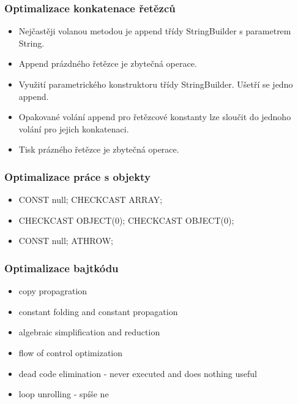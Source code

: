 \subsubsection{Optimalizace konkatenace řetězců}

\begin{itemize}
\item Nejčastěji volanou metodou je append třídy StringBuilder s parametrem String.
\item Append prázdného řetězce je zbytečná operace.
\item Využití parametrického konstruktoru třídy StringBuilder. Ušetří se jedno append.
\item Opakované volání append pro řetězcové konstanty lze sloučit do jednoho volání pro jejich konkatenaci.
\item Tisk prázného řetězce je zbytečná operace.
\end{itemize}

\subsubsection{Optimalizace práce s objekty}

\begin{itemize}
\item CONST null; CHECKCAST ARRAY;
\item CHECKCAST OBJECT(0); CHECKCAST OBJECT(0); 
\item CONST null; ATHROW;
\end{itemize}

\subsubsection{Optimalizace bajtkódu}

\begin{itemize}
\item copy propagration
\item constant folding and constant propagation
\item algebraic simplification and reduction
\item flow of control optimization
\item dead code elimination - never executed and does nothing useful
\item loop unrolling - spíše ne
\end{itemize}



